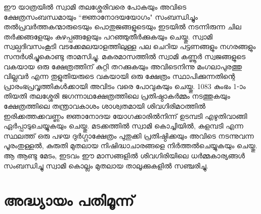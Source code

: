 \documentclass[12pt,openany]{book}
\begin{document}
	ഈ യാത്രയിൽ സ്വാമി തലശ്ശേരിവരെ പോകയും അവിടെ ക്ഷേത്രസംബന്ധമായും ``ജ്ഞാനോദയയോഗം" സംബന്ധിച്ചും തൽപ്രവർത്തകന്മാരുടെയും പൊതുജങ്ങളുടെയും ഇടയിൽ നടന്നിരുന്ന ചില തർക്കങ്ങളേയും കുഴപ്പങ്ങളേയും പറഞ്ഞുതീർക്കുകയും ചെയ്തു. സ്വാമി സ്വല്പദിവസംകൂടി വടക്കേമലയാളത്തിലുള്ള പല ചെറിയ പട്ടണങ്ങളും നഗരങ്ങളും സന്ദർശിച്ചുകൊണ്ടു താമസിച്ചു. മകരമാസത്തിൽ സ്വാമി കണ്ണൂർ സ്വജങ്ങളുടെ വകയായ ഒരു ക്ഷേത്രത്തിന് കുറ്റി തറക്കുകയും അവിടെനിന്നു മംഗലാപുരത്തു വില്ലവർ എന്ന തുളുതിയരുടെ വകയായി ഒരു ക്ഷേത്രം സ്ഥാപിക്കുന്നതിന്റെ പ്രാരംഭപ്രവൃത്തികൾക്കായി അവിടം വരെ പോവുകയും ചെയ്തു. 1083 കുംഭം 1-ാം തിയതി തലശ്ശേരി ജഗന്നാഥക്ഷേത്രത്തിലെ പ്രതിഷ്ഠാകർമ്മം നടത്തുകയും ക്ഷേത്രത്തിലെ തന്ത്രാവകാശം ശാശ്വതമായി ശിവഗിരിമഠത്തിൽ ഇരിക്കത്തക്കവണ്ണം ജ്ഞാനോദയ യോഗക്കാരിൽനിന്ന് ഉടമ്പടി എഴുതിവാങ്ങി ഏർപ്പാടുചെയ്യുകയും ചെയ്തു. മടക്കത്തിൽ സ്വാമി കൊച്ചിയിൽ, കുളമ്പടി എന്ന സ്ഥലത്ത് ഒരു പഴയ ദുർഗ്ഗാക്ഷേത്രം പുതുക്കി പ്രതിഷ്ഠിക്കയും അവിടെ നടന്നുവന്ന പൂരംതുള്ളൽ, കുരുതി മുതലായ നിഷിദ്ധാചാരങ്ങളെ നിർത്തൽചെയ്യുകയും ചെയ്തു. ആ ആണ്ടു മേടം, ഇടവം ഈ മാസങ്ങളിൽ ശിവഗിരിയിലെ ധർമ്മകാര്യങ്ങൾ സംബന്ധിച്ചു സ്വാമി കൊല്ലം മുതലായ താലൂക്കുകളിൽ സഞ്ചരിച്ചു.
	
	\newpage
	\chapter*{അദ്ധ്യായം പതിമൂന്ന്}
	
\end{document}
